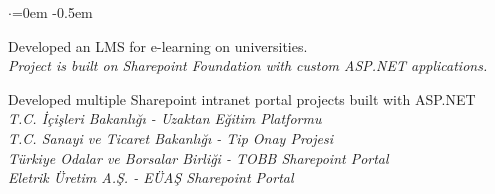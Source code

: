 \documentclass{article}
\newenvironment{rExpDetails}[0]{
    \begin{adjustwidth}{20pt}{0pt}
    \begin{list}
    {$\cdot$}{\leftmargin=0em}
    \itemsep -0.5em \vspace{-0.5em}
}{
    \end{list}
    \vspace{0.3em}
    \end{adjustwidth}
}
\newcommand{\asp}{ASP.NET\xspace}
\begin{document}
\begin{rExpDetails}
    \item Developed an LMS for e-learning on universities.
    \\ \hspace*{10mm} \textit{Project is built on Sharepoint Foundation with custom \asp applications.}
    \item Developed multiple Sharepoint intranet portal projects built with \asp
    \\ \hspace*{10mm} \textit{T.C. İçişleri Bakanlığı - Uzaktan Eğitim Platformu}
    \\ \hspace*{10mm} \textit{T.C. Sanayi ve Ticaret Bakanlığı - Tip Onay Projesi}
    \\ \hspace*{10mm} \textit{Türkiye Odalar ve Borsalar Birliği - TOBB Sharepoint Portal}
    \\ \hspace*{10mm} \textit{Eletrik Üretim A.Ş. - EÜAŞ Sharepoint Portal}
\end{rExpDetails}
\end{document}
